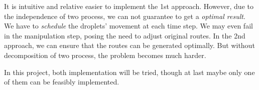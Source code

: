 \documentclass[a4paper,12pt]{article}
\begin{document}
It is intuitive and relative easier to implement the 1st approach.
However, due to the independence of two process, we can not guarantee to get a \textit{optimal result}.
We have to \textit{schedule} the droplets' movement at each time step.
We may even fail in the manipulation step, posing the need to adjust original routes.
In the 2nd approach, we can ensure that the routes can be generated optimally.
But without decomposition of two process, the problem becomes much harder.

In this project, both implementation will be tried, though at last maybe only one of them can be feasibly implemented.

\end{document}
